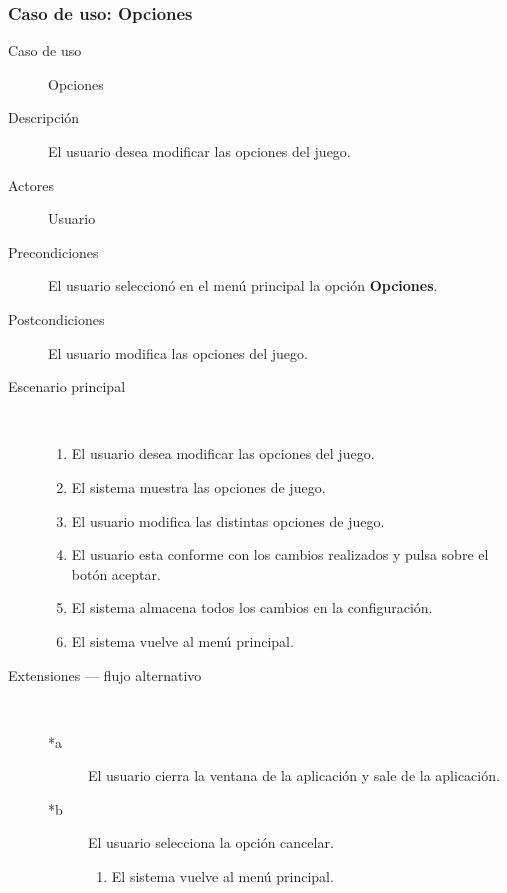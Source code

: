 \subsubsection{Caso de uso: Opciones}

\begin{description}
    \item[Caso de uso] Opciones
    \item[Descripción] El usuario desea modificar las opciones del juego.
    \item[Actores] Usuario
    
    \item[Precondiciones] El usuario seleccionó en el menú principal la opción \textbf{Opciones}.
    \item[Postcondiciones] El usuario modifica las opciones del juego.
    
    \item[Escenario principal] $\quad$
        \begin{enumerate}
            \item El usuario desea modificar las opciones del juego.
            \item El sistema muestra las opciones de juego.
            \item El usuario modifica las distintas opciones de juego.
            \item El usuario esta conforme con los cambios realizados y pulsa sobre el botón aceptar.
            \item El sistema almacena todos los cambios en la configuración.
            \item El sistema vuelve al menú principal.
        \end{enumerate}
    \item[Extensiones --- flujo alternativo] $\quad$
        \begin{description}
            \item[*a ] El usuario cierra la ventana de la aplicación y sale de la aplicación.
            \item[*b ] El usuario selecciona la opción cancelar.
                \begin{enumerate}
                    \item El sistema vuelve al menú principal.
                \end{enumerate}
            
            

\end{description}
\end{description}
